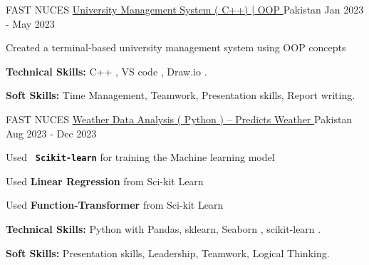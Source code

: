 

\begin{cventries}

  \cventry
    {FAST NUCES} %
    {\href{https://github.com/shafeenyousafzaii/University-Management-System-with-C-}{University Management System ( C++) | OOP }   } %
    {Pakistan} %
    {Jan 2023 - May 2023} %
    {
      \begin{cvitems} %
        \item {Created a terminal-based university management system using OOP concepts }
\        \item {\textbf{Technical Skills:} C++ , VS code , Draw.io .}
        \item {\textbf{Soft Skills:} Time Management, Teamwork, Presentation skills, Report writing.}
      \end{cvitems}
    }



  \cventry
    {FAST NUCES} %
    {\href{https://github.com/shafeenyousafzaii/Weather-Data-Analysis-Project}{Weather Data Analysis ( Python ) – Predicts Weather }} %
    {Pakistan} %
    {Aug 2023 - Dec 2023} %
    {
      \begin{cvitems} %
      \item {Used \texttt{\textbf{ Scikit-learn}} for training the Machine learning model}
      \item {Used \textbf{Linear Regression} from Sci-kit Learn}
      \item {Used \textbf{Function-Transformer} from Sci-kit Learn}
        \item {\textbf{Technical Skills:} Python with Pandas, sklearn, Seaborn , scikit-learn .}
        \item {\textbf{Soft Skills:} Presentation skills, Leadership, Teamwork, Logical Thinking.}
      \end{cvitems}
    }


\end{cventries}
